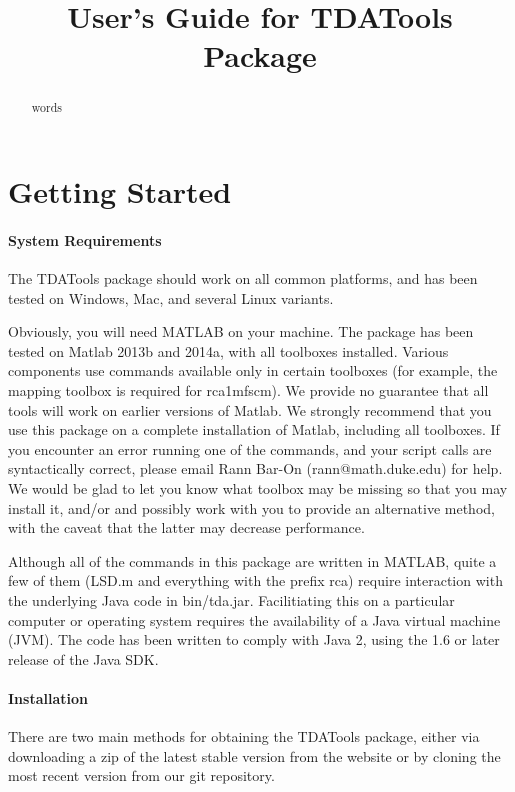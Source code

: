 \documentclass[a4paper,10pt]{article}
\title{User's Guide for TDATools Package}
\author{}
\begin{document}
\maketitle

\begin{abstract}
words
\end{abstract}

\section{Getting Started}


\paragraph{System Requirements}

The TDATools package should work on all common platforms, and has been tested on Windows, Mac, and several Linux variants.

Obviously, you will need MATLAB on your machine.
The package has been tested on Matlab 2013b and 2014a, with all toolboxes installed.  Various components use commands available only in certain toolboxes (for example, the mapping toolbox is required for rca1mfscm).  We provide no guarantee that all tools will work on earlier versions of Matlab.  We strongly recommend that you use this package on a complete installation of Matlab, including all toolboxes.  
If you encounter an error running one of the commands, and your script calls are syntactically correct, please email Rann Bar-On (rann@math.duke.edu) for help.  We would be glad to let you know what toolbox may be missing so that you may install it, and/or and possibly work with you to provide an alternative method, with the caveat that the latter may decrease performance.

Although all of the commands in this package are written in MATLAB, quite a few of them (LSD.m and everything with the prefix rca) require interaction with the underlying
Java code in bin/tda.jar.
Facilitiating this on a particular computer or
operating system requires the availability of a Java virtual machine (JVM). The code has been written
to comply with Java 2, using the 1.6 or later release of the Java SDK.

\paragraph{Installation}

There are two main methods for obtaining the TDATools package, either via downloading a zip of the latest stable version from the website or by cloning 
the most recent version from our git repository.
\end{document}
